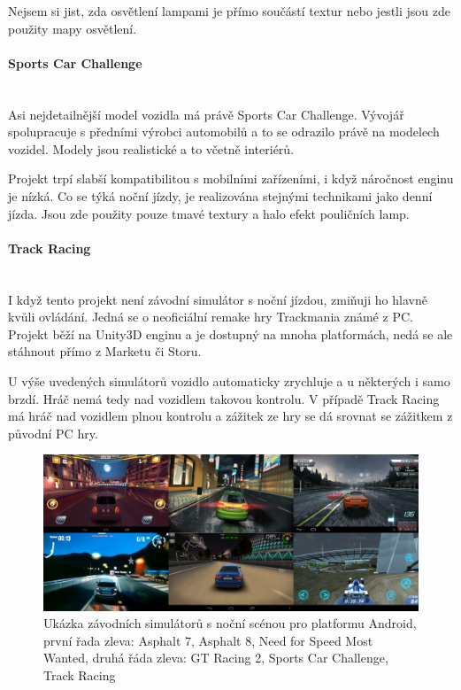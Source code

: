 \documentclass[11pt,twoside,a4paper]{book}
\begin{document}
Nejsem si jist, zda osvětlení lampami je přímo součástí textur nebo jestli jsou zde použity mapy osvětlení.

\paragraph{Sports Car Challenge}\mbox{}\\

Asi nejdetailnější model vozidla má právě Sports Car Challenge. Vývojář spolupracuje s předními výrobci automobilů a to se odrazilo právě na modelech vozidel. Modely jsou realistické a to včetně interiérů.

Projekt trpí slabší kompatibilitou s mobilními zařízeními, i když náročnost enginu je nízká. Co se týká noční jízdy, je realizována stejnými technikami jako denní jízda. Jsou zde použity pouze tmavé textury a halo efekt pouličních lamp.

\paragraph{Track Racing}\mbox{}\\

I když tento projekt není závodní simulátor s noční jízdou, zmiňuji ho hlavně kvůli ovládání. Jedná se o neoficiální remake hry Trackmania známé z PC. Projekt běží na Unity3D enginu a je dostupný na mnoha platformách, nedá se ale stáhnout přímo z Marketu či Storu.

U výše uvedených simulátorů vozidlo automaticky zrychluje a u některých i samo brzdí. Hráč nemá tedy nad vozidlem takovou kontrolu. V případě Track Racing má hráč nad vozidlem plnou kontrolu a zážitek ze hry se dá srovnat se zážitkem z původní PC hry.
\newpage

\begin{center}
\begin{figure}[h!]
\includegraphics[width=150mm]{figures/games.png}
\caption{Ukázka závodních simulátorů s noční scénou pro platformu Android, první řada zleva: Asphalt 7, Asphalt 8, Need for Speed Most Wanted, druhá řáda zleva: GT Racing 2, Sports Car Challenge, Track Racing}
\end{figure}
\end{center}
\end{document}
